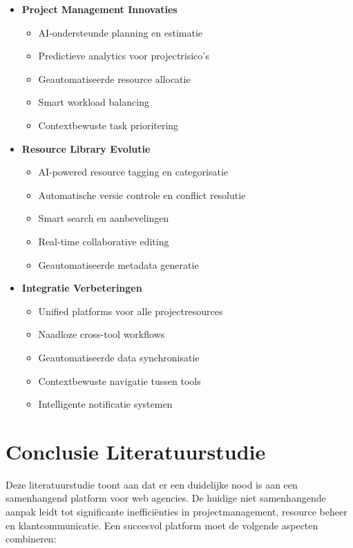 \begin{itemize}
    \item \textbf{Project Management Innovaties}
    \begin{itemize}
        \item AI-ondersteunde planning en estimatie
        \item Predictieve analytics voor projectrisico's
        \item Geautomatiseerde resource allocatie
        \item Smart workload balancing
        \item Contextbewuste task prioritering
    \end{itemize}
    
    \item \textbf{Resource Library Evolutie}
    \begin{itemize}
        \item AI-powered resource tagging en categorisatie
        \item Automatische versie controle en conflict resolutie
        \item Smart search en aanbevelingen
        \item Real-time collaborative editing
        \item Geautomatiseerde metadata generatie
    \end{itemize}
    
    \item \textbf{Integratie Verbeteringen}
    \begin{itemize}
        \item Unified platforms voor alle projectresources
        \item Naadloze cross-tool workflows
        \item Geautomatiseerde data synchronisatie
        \item Contextbewuste navigatie tussen tools
        \item Intelligente notificatie systemen
    \end{itemize}
\end{itemize}

\section{Conclusie Literatuurstudie}
\label{sec:conclusie}

Deze literatuurstudie toont aan dat er een duidelijke nood is aan een samenhangend platform voor web agencies. De huidige niet samenhangende aanpak leidt tot significante inefficiënties in projectmanagement, resource beheer en klantcommunicatie. Een succesvol platform moet de volgende aspecten combineren:

